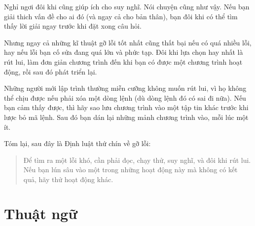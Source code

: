 \documentclass[12pt]{book}
\begin{document}
Nghỉ ngơi đôi khi cũng giúp ích cho suy nghĩ. Nói chuyện cũng như
vậy. Nếu bạn giải thich vấn đề cho ai đó (và ngay cả cho bản thân),
bạn đôi khi có thể tìm thấy lời giải ngay trước khi đặt xong câu
hỏi.

Nhưng ngay cả những kĩ thuật gỡ lỗi tốt nhất cũng thất bại nếu có
quá nhiều lỗi, hay nếu lỗi bạn cố sửa đang quá lớn và phức tạp. 
Đôi khi lựa chọn hay nhất là rút lui, làm đơn giản chương trình
đến khi bạn có được một chương trình hoạt động, rồi sau đó phát triển
lại.

Những người mới lập trình thường miễn cưỡng không muốn rút lui,
vì họ không thể chịu được nếu phải xóa một dòng lệnh (dù dòng lệnh
đó có sai đi nữa). Nếu bạn cảm thấy được, thì hãy sao lưu chương trình
vào một tập tin khác trước khi lược bỏ mã lệnh. Sau đó bạn dán 
lại những mảnh chương trình vào, mỗi lúc một ít.

Tóm lại, sau đây là Định luật thứ chín về gỡ lỗi:

\begin{quote}
Để tìm ra một lỗi khó, cần phải đọc, chạy thử, suy nghĩ, và đôi khi
rút lui. Nếu bạn lún sâu vào một trong những hoạt động này mà không
có kết quả, hãy thử hoạt động khác.
\end{quote}



\section{Thuật ngữ}
\end{document}

